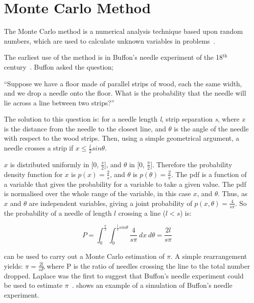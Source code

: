 \section{Monte Carlo Method}\label{sec:mcmethod}
The Monte Carlo method is a numerical analysis technique based upon random numbers, which are used to calculate unknown variables in problems~\cite{cashwell1959practical,rogers1990monte}. 

The earliest use of the method is in Buffon's needle experiment of the 18$^{\text{th}}$ century~\cite{badger1994lazzarini,beckmann2015history,buffon1785histoire}. Buffon asked the question;

\medskip

``Suppose we have a floor made of parallel strips of wood, each the same width, and we drop a needle onto the floor. What is the probability that the needle will lie across a line between two strips?''

\medskip

The solution to this question is:
for a needle length \textit{l}, strip separation \textit{s}, where \textit{x} is the distance from the needle to the closest line, and $\theta$ is the angle of the needle with respect to the wood strips. Then, using a simple geometrical argument, a needle crosses a strip if $x \leq \tfrac{l}{2} sin \theta$.

$x$ is distributed uniformly in [0, $\tfrac{s}{2}$], and $\theta$ in [0, $\tfrac{\pi}{2}$]. Therefore the probability density function for $x$ is $p(x)=\tfrac{2}{s}$, and $\theta$ is $p(\theta) = \tfrac{2}{\pi}$. The \gls*{pdf} is a function of a variable that gives the probability for a variable to take a given value. The \gls*{pdf} is normalised over the whole range of the variable, in this case $x$, and $\theta$.
Thus, as $x$ and $\theta$ are independent variables, giving a joint probability of $p(x,\theta) = \tfrac{4}{s \pi}$.
So the probability of a needle of length $l$ crossing a line ($l<s$) is:

\begin{equation}
P=\int_0^{\frac{\pi}{2}}\int_0^{\frac{l}{2}sin\theta}\frac{4}{s\pi}\ dx\ d\theta = \frac{2 l}{s \pi}\label{eqn:buffon}
\end{equation}


 can be used to carry out a Monte Carlo estimation of $\pi$. A simple rearrangement yields: $\pi = \tfrac{2l}{sP}$ where P is the ratio of needles crossing the line to the total number dropped. Laplace was the first to suggest that Buffon's needle experiment could be used to estimate $\pi$~\cite{beckmann2015history}. 
 shows an example of a simulation of Buffon's needle experiment.

